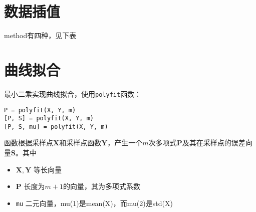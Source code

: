 \section{数据插值}
\begin{table}[!htb]
	\centering
\end{table}
method有四种，见下表
\begin{table}[!htb]
	\centering
\end{table}

\section{曲线拟合}
最小二乘实现曲线拟合，使用\lstinline|polyfit|函数：
\begin{center}
	\lstinline|P = polyfit(X, Y, m)|\\
	\lstinline|[P, S] = polyfit(X, Y, m)|\\
	\lstinline|[P, S, mu] = polyfit(X, Y, m)|
\end{center}
函数根据采样点$\bm{X}$和采样点函数$\bm{Y}$，产生一个$m$次多项式$\bm{P}$及其在采样点的误差向量$\bm{S}$。其中
\begin{itemize}
	\item $\bm{X, Y}$ \quad 等长向量
	\item $\bm{P}$ \quad 长度为$m + 1$的向量，其为多项式系数
	\item \lstinline|mu| \quad 二元向量，mu(1)是mean(X)，而mu(2)是std(X)
\end{itemize}



























